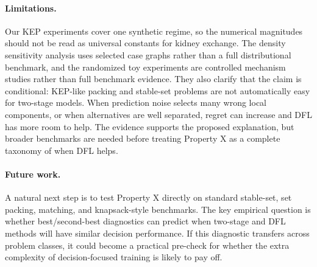 \paragraph{Limitations.}
Our KEP experiments cover one synthetic regime, so the numerical magnitudes
should not be read as universal constants for kidney exchange. The density
sensitivity analysis uses selected case graphs rather than a full distributional
benchmark, and the randomized toy experiments are controlled mechanism studies
rather than full benchmark evidence. They also clarify that the claim is
conditional: KEP-like packing and stable-set problems are not automatically
easy for two-stage models. When prediction noise selects many wrong local
components, or when alternatives are well separated, regret can increase and DFL
has more room to help. The evidence supports the proposed explanation, but
broader benchmarks are needed before treating Property X as a complete taxonomy
of when DFL helps.

\paragraph{Future work.}
A natural next step is to test Property X directly on standard stable-set, set
packing, matching, and knapsack-style benchmarks. The key empirical question is
whether best/second-best diagnostics can predict when two-stage and DFL methods
will have similar decision performance. If this diagnostic transfers across
problem classes, it could become a practical pre-check for whether the extra
complexity of decision-focused training is likely to pay off.
